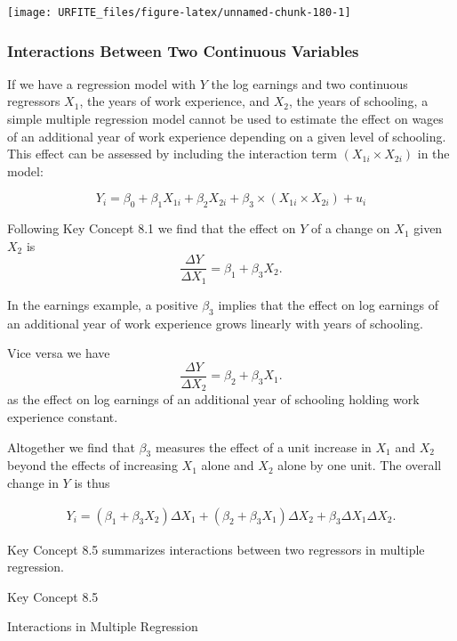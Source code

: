 \documentclass[]{book}
\theoremstyle{definition}
\theoremstyle{definition}
\theoremstyle{definition}
\theoremstyle{remark}
\begin{document}
\begin{center}\texttt{[image: URFITE\_files/figure-latex/unnamed-chunk-180-1]} \end{center}

\subsubsection*{Interactions Between Two Continuous
Variables}\label{interactions-between-two-continuous-variables}

If we have a regression model with \(Y\) the log earnings and two
continuous regressors \(X_1\), the years of work experience, and
\(X_2\), the years of schooling, a simple multiple regression model
cannot be used to estimate the effect on wages of an additional year of
work experience depending on a given level of schooling. This effect can
be assessed by including the interaction term \((X_{1i} \times X_{2i})\)
in the model:

\[ Y_i = \beta_0 + \beta_1 X_{1i} + \beta_2 X_{2i} + \beta_3 \times (X_{1i} \times X_{2i}) + u_i \]

Following Key Concept 8.1 we find that the effect on \(Y\) of a change
on \(X_1\) given \(X_2\) is
\[ \frac{\Delta Y}{\Delta X_1} = \beta_1 + \beta_3 X_2. \]

In the earnings example, a positive \(\beta_3\) implies that the effect
on log earnings of an additional year of work experience grows linearly
with years of schooling.

Vice versa we have
\[ \frac{\Delta Y}{\Delta X_2} = \beta_2 + \beta_3 X_1. \] as the effect
on log earnings of an additional year of schooling holding work
experience constant.

Altogether we find that \(\beta_3\) measures the effect of a unit
increase in \(X_1\) and \(X_2\) beyond the effects of increasing \(X_1\)
alone and \(X_2\) alone by one unit. The overall change in \(Y\) is thus

\begin{align}
Y_i = (\beta_1 + \beta_3 X_2) \Delta X_1 + (\beta_2 + \beta_3 X_1) \Delta X_2 + \beta_3\Delta X_1 \Delta X_2. \label{eq:generalinteraction}
\end{align}

Key Concept 8.5 summarizes interactions between two regressors in
multiple regression.

Key Concept 8.5

Interactions in Multiple Regression
\end{document}
